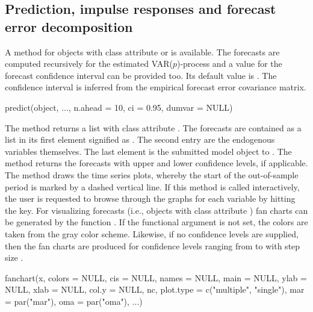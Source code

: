 \documentclass[nojss]{jss}
\begin{document}
\subsection{Prediction, impulse responses and forecast error decomposition} %
\label{subsec:dynamic}
A  method for objects with class attribute 
or  is available. The  forecasts are
computed recursively for the estimated VAR($p$)-process and a value for the
forecast confidence interval can be provided too. Its default value is
. The confidence interval is inferred from the empirical forecast
error covariance matrix. 
\begin{CodeInput}
predict(object, ..., n.ahead = 10, ci = 0.95, dumvar = NULL)
\end{CodeInput}
The  method returns a list with class attribute
. The forecasts are contained as a list in its first element
signified as . The second entry are the
endogenous variables themselves. The last element is the submitted
model object to . The  method returns the
forecasts with upper and lower confidence levels, if applicable. The
 method draws the time series plots, whereby the start of
the out-of-sample period is marked by a dashed vertical line. If this
method is called interactively, the user is requested to browse
through the graphs for each variable by hitting the 
key. For visualizing forecasts (i.e., objects with class
attribute ) fan charts can be generated by the function
 \citep[see][]{BRI1998}. If the functional argument
 is not set, the colors are taken from the gray color
scheme. Likewise, if no confidence levels are supplied, then the fan
charts are produced for confidence levels ranging from  to 
with step size .  
\begin{CodeInput}
fanchart(x, colors = NULL, cis = NULL, names = NULL, main = NULL,
  ylab = NULL, xlab = NULL, col.y = NULL, nc, plot.type = c("multiple",
  "single"), mar = par("mar"), oma = par("oma"), ...)
\end{CodeInput}  
\end{document}
